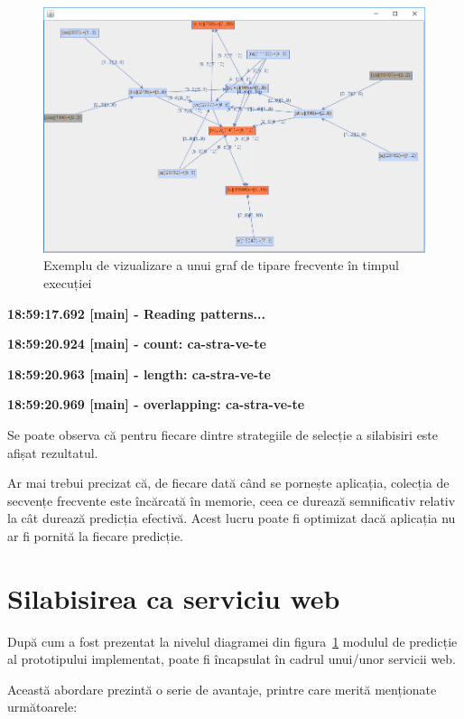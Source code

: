 \begin{figure}[h!]
    \centering
    \includegraphics[width=1.0\textwidth]{figures/rosil-castravete.png}
    \caption{Exemplu de vizualizare a unui graf de tipare frecvente în timpul execuției}
    \label{fig:rosil-service}
\end{figure}


\textbf{18:59:17.692 [main] - Reading patterns...}

\textbf{18:59:20.924 [main] - count: ca-stra-ve-te}

\textbf{18:59:20.963 [main] - length: ca-stra-ve-te}

\textbf{18:59:20.969 [main] - overlapping: ca-stra-ve-te}

Se poate observa că pentru fiecare dintre strategiile de selecție a silabisiri este afișat rezultatul. 

Ar mai trebui precizat că, de fiecare dată când se pornește aplicația, colecția de secvențe frecvente este încărcată în memorie, ceea ce durează semnificativ relativ la cât durează predicția efectivă. Acest lucru poate fi optimizat dacă aplicația nu ar fi pornită la fiecare predicție.

\section{Silabisirea ca serviciu web}

După cum a fost prezentat la nivelul diagramei din figura~\ref{fig:rosil-service} modulul de predicție al prototipului implementat, poate fi încapsulat în cadrul unui/unor servicii web.

Această abordare prezintă o serie de avantaje, printre care merită menționate următoarele:

